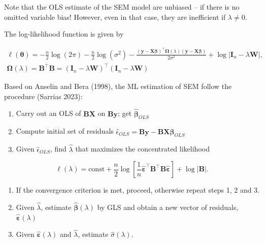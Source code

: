 \documentclass[
  letterpaper,
]{scrbook}
\begin{document}
Note that the OLS estimate of the SEM model are unbiased -- if there is
no omitted variable bias! However, even in that case, they are
inefficient if \(\lambda \neq 0\).

The log-likelihood function is given by

\[
\begin{split}
\ell(\boldsymbol{\mathbf{\theta}}) = - \frac{n}{2}\log(2\pi) - \frac{n}{2}\log(\sigma^2)-\frac{(\boldsymbol{\mathbf{y}} - \boldsymbol{\mathbf{X}}\boldsymbol{\mathbf{\beta}})^\intercal \boldsymbol{\mathbf{\Omega}}(\lambda) (\boldsymbol{\mathbf{y}} - \boldsymbol{\mathbf{X}}\boldsymbol{\mathbf{\beta}})}{2\sigma^2} + \log\left|\boldsymbol{\mathbf{I}}_n - \lambda \boldsymbol{\mathbf{W}}\right|, \\
\boldsymbol{\mathbf{\Omega}}(\lambda) = \boldsymbol{\mathbf{B}}^\intercal \boldsymbol{\mathbf{B}} = \left(\boldsymbol{\mathbf{I}}_n-\lambda\boldsymbol{\mathbf{W}}\right)^\intercal \left(\boldsymbol{\mathbf{I}}_n-\lambda\boldsymbol{\mathbf{W}}\right)
\end{split}
\]

Based on Anselin and Bera (1998), the ML estimation of SEM follow the
procedure (Sarrias 2023):

\begin{enumerate}
\def\labelenumi{\arabic{enumi})}
\item
  Carry out an OLS of \(\boldsymbol{\mathbf{B}}\boldsymbol{\mathbf{X}}\)
  on \(\boldsymbol{\mathbf{B}}\boldsymbol{\mathbf{y}}\); get
  \(\widehat{\boldsymbol{\mathbf{\beta}}}_{OLS}\)
\item
  Compute initial set of residuals
  \(\widehat{\epsilon}_{OLS} = \boldsymbol{\mathbf{B}}\boldsymbol{\mathbf{y}} - \boldsymbol{\mathbf{B}}\boldsymbol{\mathbf{X}}\widehat{\boldsymbol{\mathbf{\beta}}}_{OLS}\)
\item
  Given \(\widehat{\epsilon}_{OLS}\), find \(\widehat{\lambda}\) that
  maximizes the concentrated likelihood
\end{enumerate}

\[
\ell(\lambda)= \mbox{const} + \frac{n}{2}\log\left[\frac{1}{n}\widehat{\boldsymbol{\mathbf{\varepsilon}}}^\intercal\boldsymbol{\mathbf{B}}^\intercal\boldsymbol{\mathbf{B}} \widehat{\boldsymbol{\mathbf{\varepsilon}}}\right] + \log\left|\boldsymbol{\mathbf{B}}\right|.
\]

\begin{enumerate}
\def\labelenumi{\arabic{enumi})}
\setcounter{enumi}{3}
\item
  If the convergence criterion is met, proceed, otherwise repeat steps
  1, 2 and 3.
\item
  Given \(\widehat{\lambda}\), estimate
  \(\widehat{\boldsymbol{\mathbf{\beta}}}(\lambda)\) by GLS and obtain a
  new vector of residuals,
  \(\widehat{\boldsymbol{\mathbf{\varepsilon}}}(\lambda)\)
\item
  Given \(\widehat{\boldsymbol{\mathbf{\varepsilon}}}(\lambda)\) and
  \(\widehat{\lambda}\), estimate \(\widehat{\sigma}(\lambda)\).
\end{enumerate}
\end{document}
